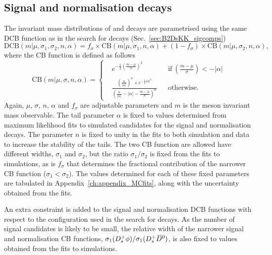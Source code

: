 \subsection{Signal and normalisation decays}
\label{sec:B2DsPhi_signalcomps}

The invariant mass distributions of \decay{\Bp}{\Dsp\phiz} and \decay{\Bp}{\Dsp\Dzb} decays are parametrised using the same DCB function as in the search for \decay{\Bp}{\Dsp\Kp\Km} decays (Sec.~\ref{sec:B2DsKK_sigcomps})
\begin{equation}
\text{DCB}(m|\mu,\sigma_1,\sigma_2,n,\alpha) = f_\sigma \times \text{CB}(m|\mu,\sigma_1,n,\alpha) + (1-f_\sigma) \times \text{CB}(m|\mu,\sigma_2,n,\alpha),
\label{eq:DoubleBD}
\end{equation}
where the CB function is defined as follows
\begin{equation}
\text{CB}(m|\mu,\sigma,n,\alpha) = \left \{
  \begin{aligned}
    &e^{-\frac{1}{2} \left(\frac{m-\mu}{\sigma}\right)^2} && \text{if}\ \left(\frac{m-\mu}{\sigma}\right) < -|\alpha|\\
    &\frac{\left(\frac{n}{|\alpha|}\right)^n\times e ^{-\frac{1}{2}|\alpha|^2} }{\left(\frac{n}{|\alpha|}-|\alpha| - \frac{m-\mu}{\sigma}\right)^n} && \text{otherwise.}
  \end{aligned} \right.
\end{equation}
Again, $\mu$, $\sigma$, $n$, $\alpha$ and $f_{\sigma}$ are adjustable parameters and $m$ is the \B meson invariant mass observable.
The tail parameter $\alpha$ is fixed to values determined from maximum likelihood fits to simulated candidates for the signal and normalisation decays. The parameter $n$ is fixed to unity in the fits to both simulation and data to increase the stability of the tails.     
The two CB function are allowed have different widths, $\sigma_{1}$ and $\sigma_{2}$, but the ratio $\sigma_{1}/\sigma_{2}$ is fixed from the fits to simulations, as is $f_{\sigma}$ that determines the fractional contribution of the narrower CB function ($\sigma_{1}<\sigma_{2}$). The values determined for each of these fixed parameters are tabulated in Appendix~\ref{ch:appendix_MCfits}, along with the uncertainty obtained from the fits.

An extra constraint is added to the signal and normalisation DCB functions with respect to the configuration used in the search for \decay{\Bp}{\Dsp\Kp\Km} decays. As the number of signal candidates is likely to be small, the relative width of the narrower signal and normalisation CB functions, $\sigma_{1}({{D}^+_{s}}\phi) / \sigma_{1}({{D}^+_{s}}{{\kern 0.2em\overline{\kern -0.2em D}{}}{}^0})$, is also fixed to values obtained from the fits to simulations. 


